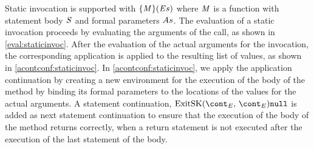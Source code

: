 \documentclass[a4paper,oneside]{article}
\begin{document}
Static invocation is supported with $\{\mathit{M}\}(\mathit{E}{s})$ where $\mathit{M}$ is a function with statement body $\mathit{S}$ and formal parameters $As$.
The evaluation of a static invocation proceeds by evaluating the arguments of the call, as shown in \eqref{eval:staticinvoc}.
After the evaluation of the actual arguments for the invocation, the corresponding application is applied to the resulting list of values, as shown in \eqref{acontconf:staticinvoc}.
In \eqref{acontconf:staticinvoc}, we apply the application continuation by creating a new environment for the execution of the body of the method by binding its formal parameters to the locations of the values for the actual arguments.
A statement continuation, $\ExitSK{\econt}{\tt{null}}$ is added as next statement continuation to ensure that the execution of the body of the method returns correctly, when a return statement is not executed after the execution of the last statement of the body.
\end{document}
